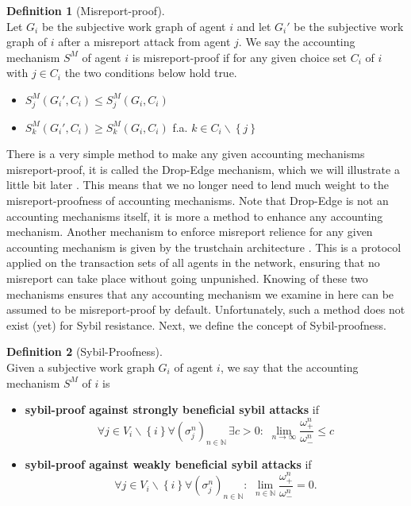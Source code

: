 \documentclass[11pt,a4paper]{article}
\theoremstyle{definition}
\newtheorem{definition}{Definition}[section]
\theoremstyle{theorem}
\theoremstyle{proposition}
\theoremstyle{corollary}
\theoremstyle{lemma}
\theoremstyle{example}
\theoremstyle{remark}
\begin{document}
\begin{definition}[Misreport-proof]\ \\
Let $G_i$ be the subjective work graph of agent $i$ and let $G_i'$ be the subjective work graph of $i$ after a misreport attack from agent $j$. We say the accounting mechanism $S^M$ of agent $i$ is misreport-proof if for any given choice set $C_i$ of $i$ with $j\in{}C_i$ the two conditions below hold true.
\begin{itemize}
\item $S^M_j(G_i',C_i)\leq{}S^M_j(G_i,C_i)$
\item $S^M_k(G_i',C_i)\geq{}S^M_k(G_i,C_i)$ f.a. $k\in{}C_i\backslash{}\left\lbrace{}j\right\rbrace$
\end{itemize}
\end{definition}
\noindent{}There is a very simple method to make any given accounting mechanisms misreport-proof, it is called the Drop-Edge mechanism, which we will illustrate a little bit later \cite{Accounting Mechanisms for Distributed Work Systems}. This means that we no longer need to lend much weight to the misreport-proofness of accounting mechanisms. Note that Drop-Edge is not an accounting mechanisms itself, it is more a method to enhance any accounting mechanism. Another mechanism to enforce misreport relience for any given accounting mechanism is given by the trustchain architecture \cite{TrustChain: A Sybil-resistant scalable blockchain}. This is a protocol applied on the transaction sets of all agents in the network, ensuring that no misreport can take place without going unpunished. Knowing of these two mechanisms ensures that any accounting mechanism we examine in here can be assumed to be misreport-proof by default. Unfortunately, such a method does not exist (yet) for Sybil resistance. Next, we define the concept of Sybil-proofness. \vspace{1em}\\

\begin{definition}[Sybil-Proofness]\ \\
Given a subjective work graph $G_i$ of agent $i$, we say that the accounting mechanism $S^M$ of $i$ is
\begin{itemize}
\item {\bf sybil-proof against strongly beneficial sybil attacks} if 
\[
\forall{}j\in{}V_i\backslash{}\left\lbrace{}i\right\rbrace \forall (\sigma^n_j)_{n\in\mathbb{N}}\,\exists{}c>0:\,\,\lim\limits_{n\rightarrow\infty}\frac{\omega^n_{+}}{\omega^n_{-}}\leq{}c
\]
\item {\bf sybil-proof against weakly beneficial sybil attacks} if 
\[
\forall{}j\in{}V_i\backslash{}\left\lbrace{}i\right\rbrace \forall (\sigma^n_j)_{n\in\mathbb{N}}:\,\,\lim\limits_{n\in\mathbb{N}}\frac{\omega^n_{+}}{\omega^n_{-}}=0.
\]
\end{itemize}
\end{definition}
\end{document}
